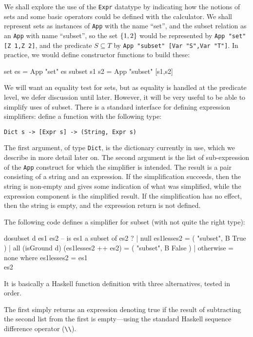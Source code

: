 We shall explore the use of the \texttt{Expr}  datatype
by indicating how the notions of sets and some basic operators
could be defined with the calculator.
We shall represent sets as instances of \texttt{App} with the name ``set'',
and the subset relation as an \texttt{App} with name ``subset'',
so the set $\{{1,2}\}$ would be represented by 
\verb$App "set" [Z 1,Z 2]$, 
and the predicate $S \subseteq T$ by
\verb$App "subset" [Var "S",Var "T"]$.
In practice, we would define constructor functions to build
these:
\begin{code}
set es = App "set" es
subset s1 s2 = App "subset" [s1,s2]
\end{code}
We will want an equality test for sets,
but as equality is handled at the predicate level, we defer discussion until later.
However, it will be very useful to be able to simplify
uses of subset.
There is a standard interface for defining expression simplifiers:
define a function with the following type:
\begin{verbatim}
Dict s -> [Expr s] -> (String, Expr s)
\end{verbatim}
The first argument, of type \texttt{Dict}, 
is the dictionary currently in use,
which we describe in more detail later on.
The second argument is the list of sub-expression of
the \texttt{App} construct for which the simplifier is intended.
The result is a pair consisting of a string and an expression.
If the simplification succeeds, then the string is non-empty
and gives some indication
of what was simplified,
while the expression component is the simplified result.
If the simplification has no effect, then the string is empty,
and the expression return is not defined.

The following code defines a simplifier for subset
(with not quite the right type):
\begin{code}
dosubset d es1 es2 -- is es1 a subset of es2 ?
  | null es1lesses2  =  ( "subset", B True )
  | all (isGround d) (es1lesses2 ++ es2)
                     =  ( "subset", B False )
  | otherwise        =  none
  where
    es1lesses2 = es1 \\ es2
\end{code}
It is basically a Haskell function definition with three alternatives,
tested in order.

The first simply returns an expression denoting true 
if the result of subtracting the second list from the first
is empty---using the standard Haskell sequence difference operator (\verb$\\$).

